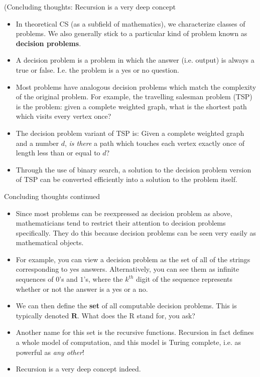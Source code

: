 \documentclass{beamer}
\begin{document}
\begin{frame}{(Concluding thoughts: Recursion is a very deep concept}
    \begin{itemize}
        \item In theoretical CS (as a subfield of mathematics), we characterize classes of problems. We also generally stick to a particular kind of problem known as \textbf{decision problems}.
        \item A decision problem is a problem in which the answer (i.e. output) is always a true or false. I.e. the problem is a yes or no question. 
        \item Most problems have analogous decision problems which match the complexity of the original problem. For example, the travelling salesman problem (TSP) is the problem: given a complete weighted graph, what is the shortest path which visits every vertex once? 
        \item The decision problem variant of TSP is: Given a complete weighted graph and a number $d$, \emph{is there} a path which touches each vertex exactly once of length less than or equal to $d$?
        \item Through the use of binary search, a solution to the decision problem version of TSP can be converted efficiently into a solution to the problem itself. 
    \end{itemize}
\end{frame}

\begin{frame}{Concluding thoughts continued}
    \begin{itemize}
        \item Since most problems can be reexpressed as decision problem as above, mathematicians tend to restrict their attention to decision problems specifically. They do this because decision problems can be seen very easily as mathematical objects. 
        \item For example, you can view a decision problem as the set of all of the strings corresponding to yes answers. Alternatively, you can see them as infinite sequences of $0$'s and $1$'s, where the $k^{th}$ digit of the sequence represents whether or not the answer is a yes or a no. 
        \item We can then define the \textbf{set} of all computable decision problems. This is typically denoted $\mathbf{R}$. What does the R stand for, you ask?
        \item Another name for this set is the recursive functions. Recursion in fact defines a whole model of computation, and this model is Turing complete, i.e. as powerful as \emph{any other}! 
        \item Recursion is a very deep concept indeed. 
    \end{itemize}
\end{frame}
\end{document}
